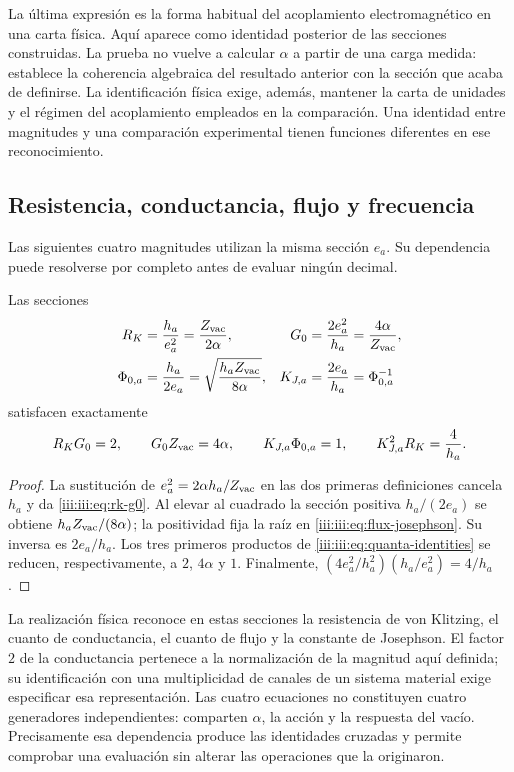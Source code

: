 La última expresión es la forma habitual del acoplamiento electromagnético
en una carta física. Aquí aparece como identidad posterior de las secciones
construidas. La prueba no vuelve a calcular $\alpha$ a partir de una carga
medida: establece la coherencia algebraica del resultado anterior con la
sección que acaba de definirse. La identificación física exige, además,
mantener la carta de unidades y el régimen del acoplamiento empleados en la
comparación. Una identidad entre magnitudes y una comparación experimental
tienen funciones diferentes en ese reconocimiento.

\subsection{Resistencia, conductancia, flujo y frecuencia}

Las siguientes cuatro magnitudes utilizan la misma sección $e_a$. Su
dependencia puede resolverse por completo antes de evaluar ningún decimal.

\begin{theorem}
Las secciones
\begin{align}
 R_K&=\frac{h_a}{e_a^2}=\frac{Z_{\rm vac}}{2\alpha},
 &G_0&=\frac{2e_a^2}{h_a}=\frac{4\alpha}{Z_{\rm vac}},
 \label{iii:iii:eq:rk-g0}\\
 \Phi_{0,a}&=\frac{h_a}{2e_a}
 =\sqrt{\frac{h_aZ_{\rm vac}}{8\alpha}},
 &K_{J,a}&=\frac{2e_a}{h_a}=\Phi_{0,a}^{-1}
 \label{iii:iii:eq:flux-josephson}
\end{align}
satisfacen exactamente
\begin{equation}
 R_KG_0=2,\qquad G_0Z_{\rm vac}=4\alpha,\qquad
 K_{J,a}\Phi_{0,a}=1,\qquad
 K_{J,a}^{2}R_K=\frac4{h_a}.
 \label{iii:iii:eq:quanta-identities}
\end{equation}
\end{theorem}
\begin{proof}
La sustitución de $e_a^2=2\alpha h_a/Z_{\rm vac}$ en las dos primeras
definiciones cancela $h_a$ y da \eqref{iii:iii:eq:rk-g0}. Al elevar al
cuadrado la sección positiva $h_a/(2e_a)$ se obtiene
$h_aZ_{\rm vac}/(8\alpha)$; la positividad fija la raíz en
\eqref{iii:iii:eq:flux-josephson}. Su inversa es $2e_a/h_a$.
Los tres primeros productos de \eqref{iii:iii:eq:quanta-identities} se
reducen, respectivamente, a $2$, $4\alpha$ y $1$. Finalmente,
$(4e_a^2/h_a^2)(h_a/e_a^2)=4/h_a$.
\end{proof}

La realización física reconoce en estas secciones la resistencia de von
Klitzing, el cuanto de conductancia, el cuanto de flujo y la constante de
Josephson. El factor $2$ de la conductancia pertenece a la normalización
de la magnitud aquí definida; su identificación con una multiplicidad de
canales de un sistema material exige especificar esa representación.
Las cuatro ecuaciones no constituyen cuatro generadores independientes:
comparten $\alpha$, la acción y la respuesta del vacío. Precisamente esa
dependencia produce las identidades cruzadas y permite comprobar una
evaluación sin alterar las operaciones que la originaron.

